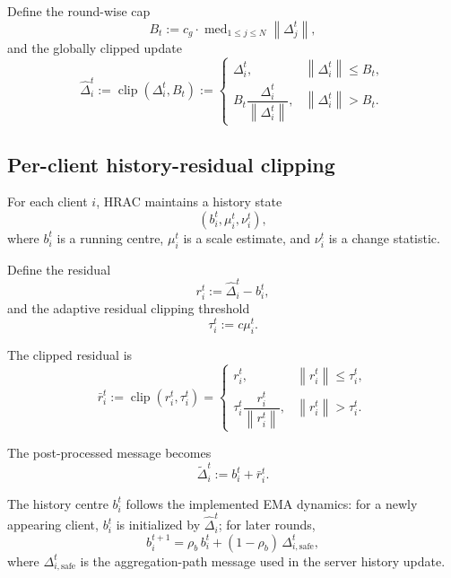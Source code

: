 \documentclass[11pt,a4paper]{article}
\theoremstyle{remark}
\newcommand{\clip}{\operatorname{clip}}
\newcommand{\med}{\operatorname{med}}
\newcommand{\norm}[1]{\left\lVert #1 \right\rVert}
\begin{document}
Define the round-wise cap
\begin{equation}
    B_t := c_g \cdot \med_{1 \le j \le N} \norm{\Delta_j^t},
    \label{eq:global_cap}
\end{equation}
and the globally clipped update
\begin{equation}
    \hat{\Delta}_i^t
    :=
    \clip(\Delta_i^t, B_t)
    :=
    \begin{cases}
        \Delta_i^t, & \norm{\Delta_i^t} \le B_t,\\[2mm]
        B_t \dfrac{\Delta_i^t}{\norm{\Delta_i^t}}, & \norm{\Delta_i^t} > B_t.
    \end{cases}
    \label{eq:global_clip}
\end{equation}

\subsection{Per-client history-residual clipping}

For each client \(i\), HRAC maintains a history state
\[
    (b_i^t,\mu_i^t,\nu_i^t),
\]
where \(b_i^t\) is a running centre, \(\mu_i^t\) is a scale estimate, and
\(\nu_i^t\) is a change statistic.

Define the residual
\begin{equation}
    r_i^t := \hat{\Delta}_i^t - b_i^t,
    \label{eq:residual}
\end{equation}
and the adaptive residual clipping threshold
\begin{equation}
    \tau_i^t := c \mu_i^t.
    \label{eq:tau}
\end{equation}

The clipped residual is
\begin{equation}
    \bar{r}_i^t
    :=
    \clip(r_i^t, \tau_i^t)
    =
    \begin{cases}
        r_i^t, & \norm{r_i^t} \le \tau_i^t,\\[2mm]
        \tau_i^t \dfrac{r_i^t}{\norm{r_i^t}}, & \norm{r_i^t} > \tau_i^t.
    \end{cases}
    \label{eq:residual_clip}
\end{equation}

The post-processed message becomes
\begin{equation}
    \tilde{\Delta}_i^t := b_i^t + \bar{r}_i^t.
    \label{eq:delta_tilde}
\end{equation}

The history centre \(b_i^t\) follows the implemented EMA dynamics:
for a newly appearing client, \(b_i^t\) is initialized by
\(\hat{\Delta}_i^t\); for later rounds,
\begin{equation}
    b_i^{t+1}
    =
    \rho_b\, b_i^t + (1-\rho_b)\,\Delta_{i,\mathrm{safe}}^t,
    \label{eq:b_update}
\end{equation}
where \(\Delta_{i,\mathrm{safe}}^t\) is the aggregation-path message used in
the server history update.
\end{document}
